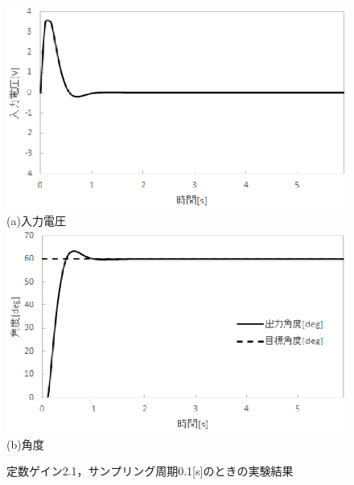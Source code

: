 \documentclass[11pt,a4paper]{jsarticle}
\begin{document}
\begin{figure}[H]
 \begin{center}
  \includegraphics[scale=.6]{./picture/regraph9.eps} \\
  (a)入力電圧 \\
  \includegraphics[scale=.6]{./picture/regraph10.eps} \\
  (b)角度
  \caption{定数ゲイン2.1，サンプリング周期0.1[s]のときの実験結果}
 \end{center}
\end{figure}
\end{document}
